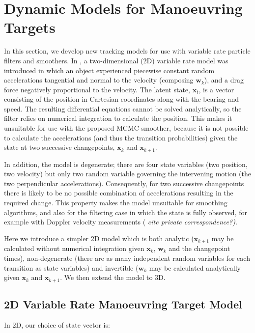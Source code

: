 \documentclass[a4paper,10pt]{article}
\newenvironment{meta}[0]{\color{red} \em}{}
\begin{document}
\section{Dynamic Models for Manoeuvring Targets} \label{sec:tracking_models}
In this section, we develop new tracking models for use with variable rate particle filters and smoothers. In \cite{Godsill2007,Godsill2007a}, a two-dimensional (2D) variable rate model was introduced in which an object experienced piecewise constant random accelerations tangential and normal to the velocity (composing $\mathbf{w}_k$), and a drag force negatively proportional to the velocity. The latent state, $\mathbf{x}_t$, is a vector consisting of the position in Cartesian coordinates along with the bearing and speed. The resulting differential equations cannot be solved analytically, so the filter relies on numerical integration to calculate the position. This makes it unsuitable for use with the proposed MCMC smoother, because it is not possible to calculate the accelerations (and thus the transition probabilities) given the state at two successive changepoints, $\mathbf{x}_k$ and $\mathbf{x}_{k+1}$.

In addition, the model is degenerate; there are four state variables (two position, two velocity) but only two random variable governing the intervening motion (the two perpendicular accelerations). Consequently, for two successive changepoints there is likely to be no possible combination of accelerations resulting in the required change. This property makes the model unsuitable for smoothing algorithms, and also for the filtering case in which the state is fully observed, for example with Doppler velocity measurements (\begin{meta}cite private correspondence?\end{meta}).

Here we introduce a simpler 2D model which is both analytic ($\mathbf{x}_{k+1}$ may be calculated without numerical integration given $\mathbf{x}_k$, $\mathbf{w}_k$ and the changepoint times), non-degenerate (there are as many independent random variables for each transition as state variables) and invertible ($\mathbf{w}_k$ may be calculated analytically given $\mathbf{x}_k$ and $\mathbf{x}_{k+1}$. We then extend the model to 3D.



\subsection{2D Variable Rate Manoeuvring Target Model}
In 2D, our choice of state vector is:
\end{document}
